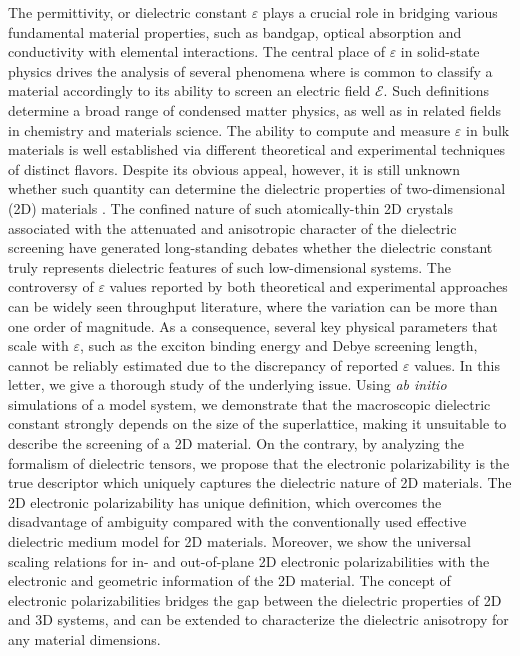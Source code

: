 The permittivity, or dielectric constant $\varepsilon$ plays a crucial
role in bridging various fundamental material properties, such as
bandgap\autocite{Moss_1950_relation,Moss_1985_n_Eg}, optical
absorption\autocite{Kittel_2005_introduction_book} and
conductivity\autocite{Dressel_2001_electrodynamics} with elemental
interactions.  The central place of $\varepsilon$ in solid-state
physics drives the analysis of several phenomena where is common to
classify a material accordingly to its ability to screen an electric
field $\mathscr{E}$. Such definitions determine a broad range of condensed
matter physics, as well as in related fields in chemistry and
materials science.  The ability to compute and measure $\varepsilon$
in bulk materials is well established via different theoretical
\autocite{Adler_1962_eps,Hybertsen_1987} and experimental techniques
\autocite{Palik_1998_handbook} of distinct flavors.
%
Despite its obvious appeal, however, it is still unknown whether such quantity can determine the 
dielectric properties of two-dimensional (2D) materials \autocite{Novoselov_2016_vdW}.  
%
The confined nature of such atomically-thin 2D crystals associated
with the attenuated and anisotropic character of the dielectric
screening
\autocite{Keldysh_1979_eps_multi,Sharma_1985_semiconductor_slab_eps,Low_2014_screening_BP,Cudazzo_2011_screening_2D,Bechstedt_2012_silicene,Cudazzo_2010_screen2D,Nazarov_2015_2D_3D}
have generated long-standing debates whether the dielectric constant
truly represents dielectric features of such low-dimensional systems.
The controversy of $\varepsilon$ values reported by both theoretical
and experimental approaches can be widely seen throughput
literature\autocite{Li_2016_screening_rev}, where the variation can be
more than one order of magnitude.
%
As a
consequence, several key physical parameters that scale with
$\varepsilon$, such as the exciton binding energy and Debye screening
length, cannot be reliably estimated due to the discrepancy of
reported $\varepsilon$ values. In this letter, we give a thorough
study of the underlying issue. Using \textit{ab initio} simulations of
a model system, we demonstrate that the macroscopic dielectric
constant strongly depends on the size of the superlattice, making it
unsuitable to describe the screening of a 2D material. On the
contrary, by analyzing the formalism of dielectric tensors, we propose
that the electronic polarizability is the true descriptor which
uniquely captures the dielectric nature of 2D materials. The 2D
electronic polarizability has unique definition, which overcomes the
disadvantage of ambiguity compared with the conventionally used
effective dielectric medium model for 2D materials. Moreover, we show
the universal scaling relations for in- and out-of-plane 2D electronic
polarizabilities with the electronic and geometric information of the
2D material. The concept of electronic polarizabilities bridges the
gap between the dielectric properties of 2D and 3D systems, and can be
extended to characterize the dielectric anisotropy for any material
dimensions.


